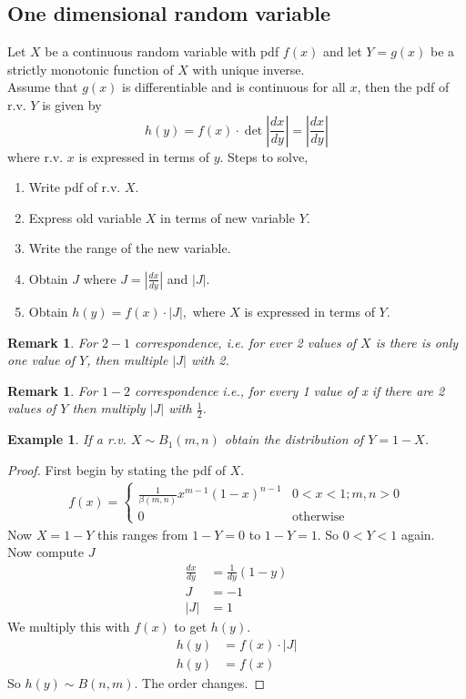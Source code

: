 \documentclass[oneside,11pt,pdftex]{book}%
\numberwithin{equation}{section}
\newtheorem{example}[theorem]{Example}
\newtheorem{remark}[theorem]{Remark}
\numberwithin{section}{chapter}
\numberwithin{equation}{chapter}
\begin{document}
\subsection{One dimensional random variable}
Let $ X $ be a continuous random variable with pdf $ f(x) $ and let $ Y=g(x) $ be a strictly monotonic function of $ X $ with unique inverse.\\
Assume that $ g(x) $ is differentiable and is continuous for all $ x $, then the pdf of r.v. $ Y $ is given by 
\[ h(y)=f(x) \cdot \det \left|\frac{dx}{dy}\right| = \left|\frac{dx}{dy}\right|\]
where r.v. $ x $ is expressed in terms of $ y $.
Steps to solve,
\begin{enumerate}
	\item Write pdf of r.v. $ X $.
	\item Express old variable $ X $ in terms of new variable $ Y $.
	\item Write the range of the new variable.
	\item Obtain $ J $ where $ J=\left|\frac{dx}{dy}\right| $ and $ |J| $.
	\item Obtain $ h(y) =f(x)\cdot |J|,$ where $ X $ is expressed in terms of $ Y. $
\end{enumerate}
\begin{remark}
		For $ 2-1 $ correspondence, i.e. for ever 2 values of $ X $ is there is only one value of $ Y $, then multiple $ |J| $ with 2.
\end{remark}
\begin{remark}
	\item For $ 1-2 $ correspondence i.e., for every 1 value of x if there are 2 values of $ Y $ then multiply $|J| $ with $ \frac{1}{2} $.
\end{remark}

\begin{example}
	If a r.v. $ X \sim B_1(m,n) $ obtain the distribution of $ Y=1-X $.
\end{example}
\begin{proof}
	First begin by stating the pdf of $ X $.
	\begin{align*}
		f(x)=\begin{cases}
			\frac{1}{\beta(m,n)}x^{m-1}(1-x)^{n-1} & 0<x<1; m,n>0\\
			0 & \text{otherwise}
		\end{cases} 
	\end{align*}
	Now $ X=1-Y $ this ranges from $ 1-Y=0 $ to $ 1-Y=1 $. So $ 0<Y<1 $ again.\\
	Now compute $ J $
	\begin{align*}
		\frac{dx}{dy}&=\frac{1}{dy} \left( 1-y \right)\\
		J&=-1\\
		|J|&=1
	\end{align*}
	We multiply this with $ f(x) $ to get $ h(y) $.
	\begin{align*}
		h(y)&=f(x)\cdot |J|\\
		h(y)&= f(x)
	\end{align*}
	So $ h(y)\sim B(n,m) $. The order changes.
\end{proof}
\end{document}

